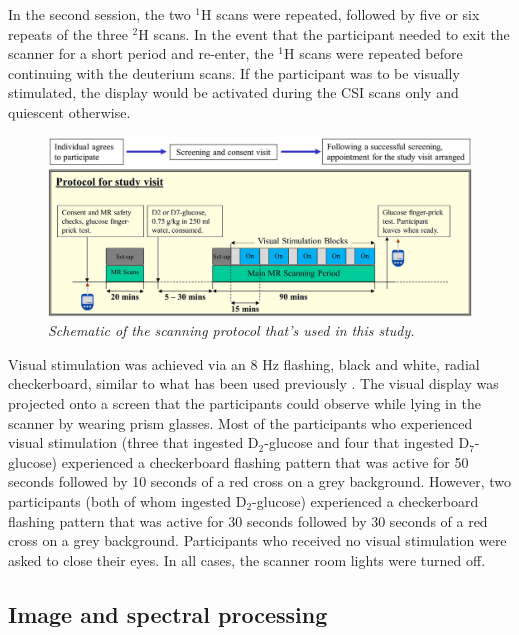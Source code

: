 In the second session, the two $^1$H scans were repeated, followed by five or six repeats of the three $^2$H scans. In the event that the participant needed to exit the scanner for a short period and re-enter, the $^1$H scans were repeated before continuing with the deuterium scans. If the participant was to be visually stimulated, the display would be activated during the \ac{CSI} scans only and quiescent otherwise.  

\begin{figure}
    \centering
    \includegraphics[width = 1\textwidth]{Figures/Glucose/Protocol.png}
    \caption{\textit{Schematic of the scanning protocol that's used in this study.}}
    \label{fig:Glu:Protocol}
\end{figure}

Visual stimulation was achieved via an 8 Hz flashing, black and white, radial checkerboard, similar to what has been used previously \cite{Fernandes2020MeasurementT}. The visual display was projected onto a screen that the participants could observe while lying in the scanner by wearing prism glasses. Most of the participants who experienced visual stimulation (three that ingested D$_2$-glucose and four that ingested D$_7$-glucose) experienced a checkerboard flashing pattern that was active for 50 seconds followed by 10 seconds of a red cross on a grey background. However, two participants (both of whom ingested D$_2$-glucose) experienced a checkerboard flashing pattern that was active for 30 seconds followed by 30 seconds of a red cross on a grey background. Participants who received no visual stimulation were asked to close their eyes. In all cases, the scanner room lights were turned off. 

\subsection{Image and spectral processing}

